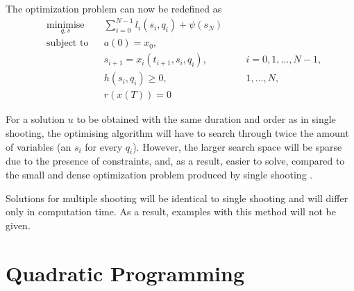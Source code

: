 \par The optimization problem can now be redefined as
\begin{equation}
    \label{eq:cost_mul_shoot}
    \begin{aligned}
    & \underset{q,s}{\text{minimise}} && \sum_{i=0}^{N-1} l_i(s_i,q_i) + \psi (s_N) \\
    & \text{subject to}  && a(0) = x_0, \\
        & && s_{i+1} = x_i (t_{i+1}, s_i, q_i), &&& i = 0,1,\dots, N-1, \\
        & && h(s_i,q_i) \geq 0, &&& 1,\dots,N, \\
        & && r(x(T)) = 0
    \end{aligned}
\end{equation}

\par For a solution $u$ to be obtained with the same duration and order as in single shooting, the optimising algorithm will have to search through twice the amount of variables (an $s_i$ for every $q_i$). However, the larger search space will be sparse due to the presence of constraints, and, as a result, easier to solve, compared to the small and dense optimization problem produced by single shooting \cite{rao2009survey}.

\par Solutions for multiple shooting will be identical to single shooting and will differ only in computation time. As a result, examples with this method will not be given.

\section{Quadratic Programming}


